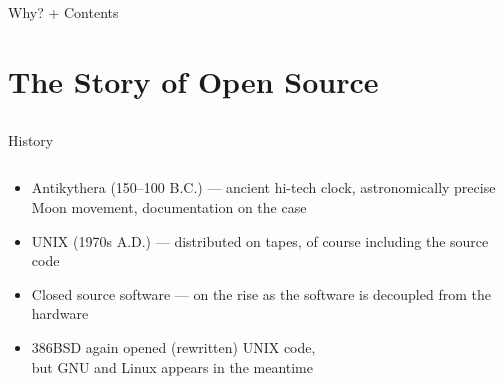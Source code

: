 \documentclass{beamer}
\begin{document}
\subsection{}
\begin{frame}{Why? + Contents}
\end{frame}


\section{The Story of Open Source}

\subsection{}
\begin{frame}{History}
\begin{columns}
\begin{column}{9cm}
\begin{itemize}
\item Antikythera (150--100 B.C.) --- ancient hi-tech clock, astronomically precise Moon movement, documentation on the case
\item UNIX (1970s A.D.) --- distributed on tapes, of course including the source code
\item Closed source software --- on the rise as the software is decoupled from the hardware
\item 386BSD again opened (rewritten) UNIX code,\\but GNU and Linux appears in the meantime
\end{itemize}
\end{column}
\end{columns}
\end{frame}
\end{document}
